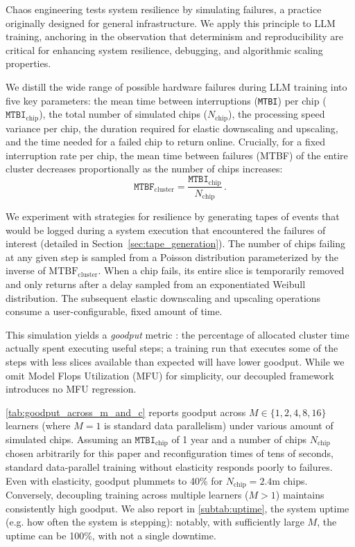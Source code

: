 \documentclass[11pt, a4paper, twocolumn, copyright, google]{google}
\begin{document}
Chaos engineering \citep{basiri2016chaos} tests system resilience by simulating failures, a practice originally designed for general infrastructure. We apply this principle to LLM training, anchoring in the observation that determinism and reproducibility are critical for enhancing system resilience, debugging, and algorithmic scaling properties.

We distill the wide range of possible hardware failures during LLM training \citep{LlamaTeam2024} into five key parameters: the mean time between interruptions (\texttt{MTBI}) per chip ($\texttt{MTBI}_{\text{chip}}$), the total number of simulated chips ($N_\text{chip}$), the processing speed variance per chip, the duration required for elastic downscaling and upscaling, and the time needed for a failed chip to return online. Crucially, for a fixed interruption rate per chip, the mean time between failures (MTBF) of the entire cluster decreases proportionally as the number of chips increases:
%
\begin{equation}
    \texttt{MTBF}_{\text{cluster}} = \frac{\texttt{MTBI}_{\text{chip}}}{N_\text{chip}}\,.
\end{equation}

We experiment with strategies for resilience by generating tapes of events that would be logged during a system execution that encountered the failures of interest (detailed in Section~\ref{sec:tape_generation}). The number of chips failing at any given step is sampled from a Poisson distribution parameterized by the inverse of $\text{MTBF}_{\text{cluster}}$. When a chip fails, its entire slice is temporarily removed and only returns after a delay sampled from an exponentiated Weibull distribution. The subsequent elastic downscaling and upscaling operations consume a user-configurable, fixed amount of time.

This simulation yields a \textit{goodput} metric \citep{wongpanich2025machinelearningfleetefficiency}: the percentage of allocated cluster time actually spent executing useful steps; a training run that executes some of the steps with less slices available than expected will have lower goodput. While we omit Model Flops Utilization (MFU) for simplicity, our decoupled framework introduces no MFU regression.

\autoref{tab:goodput_across_m_and_c} reports goodput across $M \in \{1,2,4,8,16\}$ learners (where $M=1$ is standard data parallelism) under various amount of simulated chips. Assuming an $\texttt{MTBI}_{\text{chip}}$ of 1 year and a number of chips $N_\text{chip}$ chosen arbitrarily for this paper and reconfiguration times of tens of seconds, standard data-parallel training without elasticity responds poorly to failures. Even with elasticity, goodput plummets to 40\% for $N_\text{chip}=2.4\text{m}$ chips. Conversely, decoupling training across multiple learners ($M > 1$) maintains consistently high goodput. We also report in \autoref{subtab:uptime}, the system uptime (e.g. how often the system is stepping): notably, with sufficiently large $M$, the uptime can be 100\%, with not a single downtime.
\end{document}
